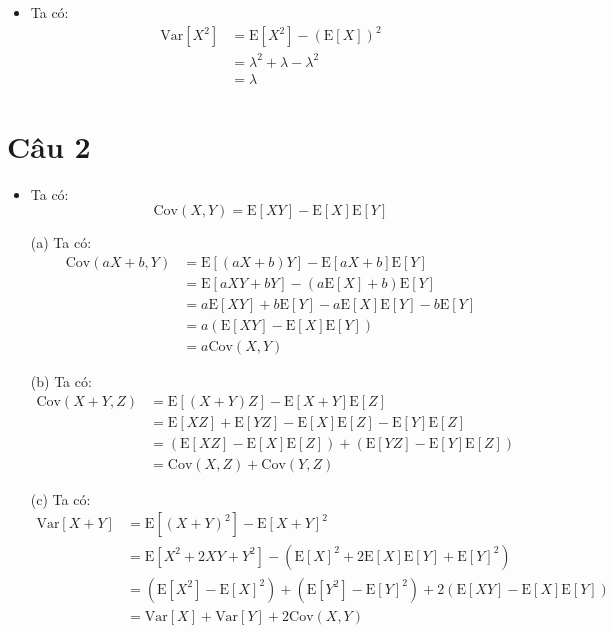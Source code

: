 \documentclass[12pt, a4paper]{article}
\newcommand{\mye}[1]{\text{E}[#1]}
\begin{document}
\begin{itemize}
    \item Ta có:
    $$
    \begin{aligned}
        \text{Var}[X^2] &= \text{E}[X^2] - (\text{E}[X])^2 \\
        &= \lambda^2 + \lambda - \lambda^2 \\
        &= \lambda
    \end{aligned}
    $$
\end{itemize}
\pagebreak

\section{Câu 2}

\begin{itemize}
    \item Ta có: 
    $$
    \text{Cov}(X, Y) = \mye{XY} - \mye{X} \mye{Y}
    $$

    \item[(a)] Ta có:
    $$
    \begin{aligned}
    \text{Cov}(aX + b, Y) &= \mye{(aX+b)Y} - \mye{aX+b}\mye{Y} \\
    &= \mye{aXY + bY} - (a\mye{X} + b)\mye{Y} \\
    &= a\mye{XY} + b\mye{Y} - a\mye{X}\mye{Y} -b \mye{Y} \\
    &= a(\mye{XY} - \mye{X}\mye{Y}) \\
    &= a \text{Cov}(X, Y)
    \end{aligned}
    $$

    \item[(b)] Ta có:
    $$
    \begin{aligned}
    \text{Cov}(X + Y, Z) &= \mye{(X+Y)Z} - \mye{X+Y}\mye{Z} \\
    &= \mye{XZ} + \mye{YZ} - \mye{X}\mye{Z} - \mye{Y}\mye{Z} \\
    &= (\mye{XZ} - \mye{X}\mye{Z}) + (\mye{YZ} - \mye{Y}\mye{Z}) \\
    &= \text{Cov}(X, Z) + \text{Cov}(Y, Z)
    \end{aligned}
    $$

    \item[(c)] Ta có:
    $$
    \begin{aligned}
        \text{Var}[X + Y] &= \mye{(X+Y)^2} - \mye{X + Y}^2 \\
        &= \mye{X^2 + 2XY + Y^2} - (\mye{X}^2 + 2\mye{X}\mye{Y} + \mye{Y}^2) \\
        &= (\mye{X^2} - \mye{X}^2) + (\mye{Y^2} - \mye{Y}^2) + 2 (\mye{XY} - \mye{X}\mye{Y}) \\
        &= \text{Var}[X] + \text{Var}[Y] + 2\text{Cov}(X, Y)
    \end{aligned}
    $$
\end{itemize}
\end{document}
